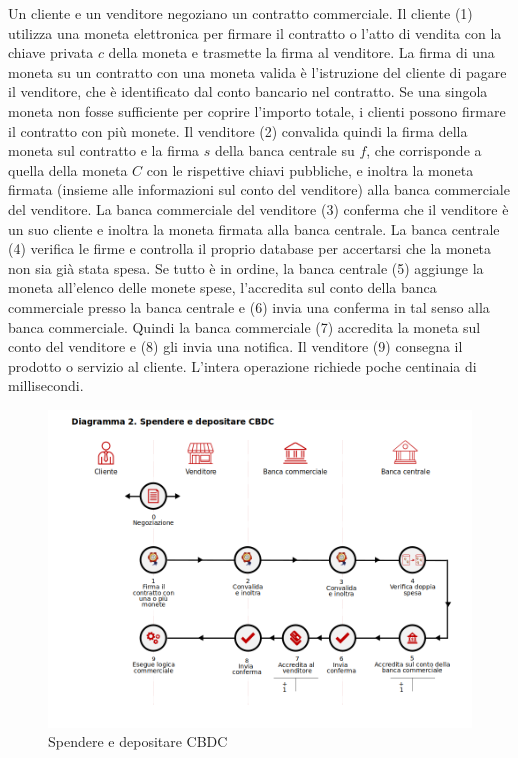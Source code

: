 \documentclass{article}
\begin{document}
Un cliente e un venditore negoziano un contratto commerciale. Il 
cliente (1) utilizza una moneta elettronica per firmare il contratto o 
l'atto di vendita con la chiave privata $c$ della moneta e trasmette la 
firma al venditore. La firma di una moneta su un contratto con una 
moneta valida è l'istruzione del cliente di pagare il venditore, che è 
identificato dal conto bancario nel contratto. Se una singola moneta 
non fosse sufficiente per coprire l'importo totale, i clienti possono 
firmare il contratto con più monete. Il venditore (2) convalida quindi 
la firma della moneta sul contratto e la firma $s$ della banca centrale 
su $f$, che  corrisponde a quella della moneta $C$ con le rispettive 
chiavi pubbliche, e inoltra la moneta firmata (insieme alle 
informazioni sul conto del venditore) alla banca commerciale del 
venditore. La banca commerciale del venditore (3) conferma che il 
venditore è un suo cliente e inoltra la moneta firmata alla banca 
centrale. La banca centrale (4) verifica le firme e controlla il 
proprio database per accertarsi che la moneta non sia già stata spesa. 
Se tutto è in ordine, la banca centrale (5) aggiunge la moneta 
all'elenco delle monete spese, l'accredita sul conto della banca 
commerciale presso la banca centrale e (6) invia una conferma in tal 
senso alla banca commerciale. Quindi la banca commerciale (7) 
accredita la moneta sul conto del venditore e (8) gli invia una 
notifica. Il venditore (9) consegna il prodotto o servizio al cliente. 
L'intera operazione richiede poche centinaia di millisecondi.

\begin{figure}[h!]
  \includegraphics[width=\textwidth]{diagramma2-it.png}
  \caption{Spendere e depositare CBDC}
  \label{fig:fig2}
\end{figure}
\end{document}
